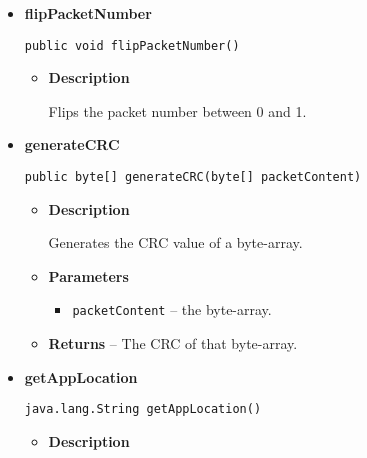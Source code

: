 {{{{{\begin{itemize}
{\begin{itemize}
{Closes the Client/Server.
}
\item{
{\bf  Parameters}
  \begin{itemize}
   \item{
\texttt{message} -- the message.}
   \item{
\texttt{status} -- 0 for a positive exit status, everything else for errors.}
  \end{itemize}
}%
\end{itemize}
}%
\item{ 
\hypertarget{filetransferUDP.FileTransfer.flipPacketNumber()}{{\bf  flipPacketNumber}\\}
\begin{lstlisting}[frame=none]
public void flipPacketNumber()\end{lstlisting} %
\begin{itemize}
\item{
{\bf  Description}

Flips the packet number between 0 and 1.
}
\end{itemize}
}%
\item{ 
\hypertarget{filetransferUDP.FileTransfer.generateCRC(byte[])}{{\bf  generateCRC}\\}
\begin{lstlisting}[frame=none]
public byte[] generateCRC(byte[] packetContent)\end{lstlisting} %
\begin{itemize}
\item{
{\bf  Description}

Generates the CRC value of a byte-array.
}
\item{
{\bf  Parameters}
  \begin{itemize}
   \item{
\texttt{packetContent} -- the byte-array.}
  \end{itemize}
}%
\item{{\bf  Returns} -- 
The CRC of that byte-array. 
}%
\end{itemize}
}%
\item{ 
\hypertarget{filetransferUDP.FileTransfer.getAppLocation()}{{\bf  getAppLocation}\\}
\begin{lstlisting}[frame=none]
 java.lang.String getAppLocation()\end{lstlisting} %
\begin{itemize}
\item{
{\bf  Description}

}
\end{itemize}}
\end{itemize}}}}}}

